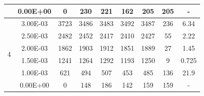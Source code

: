 \begin{table}[H]
{\begin{tabular}{|c|c|c|c|c|c|c|c|c|}
                               & 0.00E+00         & 0         & 230                                                        & 221                                                       & 162                                                       & 205     & 205    & -                                                                  \\ \hline
            \multirow{6}{*}{4} & 3.00E-03         & 3723      & 3486                                                       & 3483                                                      & 3492                                                      & 3487    & 236    & 6.34                                                               \\ \cline{2-9}
                               & 2.50E-03         & 2482      & 2452                                                       & 2417                                                      & 2410                                                      & 2427    & 55     & 2.22                                                               \\ \cline{2-9}
                               & 2.00E-03         & 1862      & 1903                                                       & 1912                                                      & 1851                                                      & 1889    & 27     & 1.45                                                               \\ \cline{2-9}
                               & 1.50E-03         & 1241      & 1264                                                       & 1292                                                      & 1193                                                      & 1250    & 9      & 0.725                                                              \\ \cline{2-9}
                               & 1.00E-03         & 621       & 494                                                        & 507                                                       & 453                                                       & 485     & 136    & 21.9                                                               \\ \cline{2-9}
                               & 0.00E+00         & 0         & 148                                                        & 186                                                       & 142                                                       & 159     & 159    & -                                                                  \\ \hline

\end{tabular}}
\end{table}
